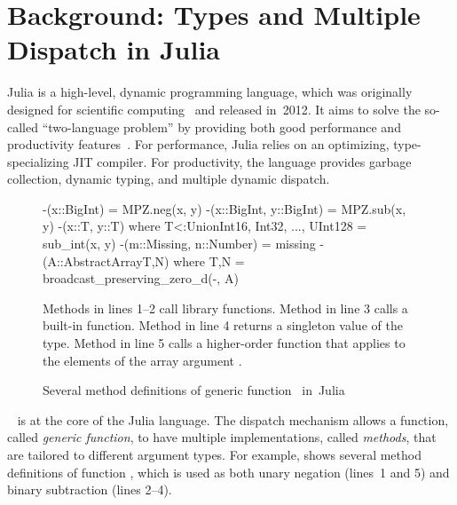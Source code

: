 \chapter{Background: Types and Multiple Dispatch in Julia}%
\label{chap:background}


Julia is a high-level, dynamic programming language, which was originally
designed for scientific computing~\cite{bib:bezanson:julia-fresh:2017}
and released in~2012.
It aims to solve the so-called ``two-language problem''
by providing both good performance and productivity
features~\cite{bib:bezanson:julia-dyn-perf:oopsla:2018}.
For performance, Julia relies on an optimizing, type-specializing JIT compiler.
For productivity, the language provides garbage collection, dynamic typing, and
multiple dynamic dispatch.

\begin{figure}[t]
\begin{julia}
-(x::BigInt) = MPZ.neg(x, y)
-(x::BigInt, y::BigInt) = MPZ.sub(x, y)
-(x::T, y::T) where T<:Union{Int16, Int32, ..., UInt128} = sub_int(x, y)
-(m::Missing, n::Number) = missing
-(A::AbstractArray{T,N}) where {T,N} = broadcast_preserving_zero_d(-, A)
\end{julia}
\caption{Several method definitions of generic function~\cjl{(-)} in~Julia
}\label{fig:code:subtraction}
\begin{tablenotes}[para]
\small
Methods in lines 1--2 call library functions.
Method in line 3 calls a built-in function.
Method in line 4 returns a singleton value  of the  type.
Method in line 5 calls a higher-order function that applies \cjl{(-)} to the
elements of the array argument .
\end{tablenotes}
\end{figure}

~\cite{bib:bobrow:common-loops:1986,%
bib:chambers:multi-cecil:1992} is at the core of the Julia language.
The dispatch mechanism allows a function, called \emph{generic
function}, to have multiple implementations, called \emph{methods}, that are
tailored to different argument types. For example, 
shows several method definitions of function \cjl{(-)},
which is used as both unary negation (lines~1 and 5)
and binary subtraction (lines 2--4).

